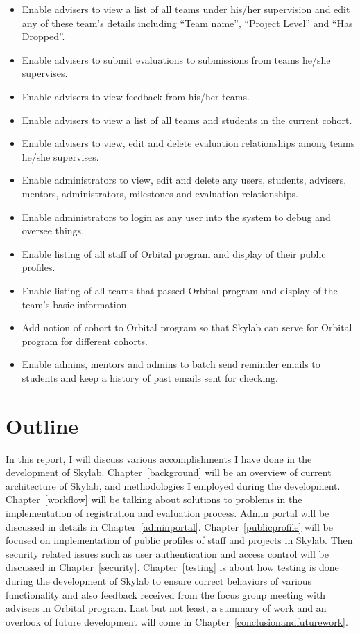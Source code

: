 \begin{itemize}
  \item Enable advisers to view a list of all teams under his/her supervision and edit any of these team's details including ``Team name'', ``Project Level'' and ``Has Dropped''.
  \item Enable advisers to submit evaluations to submissions from teams he/she supervises.
  \item Enable advisers to view feedback from his/her teams.
  \item Enable advisers to view a list of all teams and students in the current cohort.
  \item Enable advisers to view, edit and delete evaluation relationships among teams he/she supervises.
  \item Enable administrators to view, edit and delete any users, students, advisers, mentors, administrators, milestones and evaluation relationships.
  \item Enable administrators to login as any user into the system to debug and oversee things.
  \item Enable listing of all staff of Orbital program and display of their public profiles.
  \item Enable listing of all teams that passed Orbital program and display of the team's basic information.
  \item Add notion of cohort to Orbital program so that Skylab can serve for Orbital program for different cohorts.
  \item Enable admins, mentors and admins to batch send reminder emails to students and keep a history of past emails sent for checking.
\end{itemize}

\section{Outline}

In this report, I will discuss various accomplishments I have done in the development of Skylab. Chapter~\ref{background} will be an overview of current architecture of Skylab, and methodologies I employed during the development. Chapter~\ref{workflow} will be talking about solutions to problems in the implementation of registration and evaluation process. Admin portal will be discussed in details in Chapter~\ref{adminportal}. Chapter~\ref{publicprofile} will be focused on implementation of public profiles of staff and projects in Skylab. Then security related issues such as user authentication and access control will be discussed in Chapter~\ref{security}. Chapter~\ref{testing} is about how testing is done during the development of Skylab to ensure correct behaviors of various functionality and also feedback received from the focus group meeting with advisers in Orbital program. Last but not least, a summary of work and an overlook of future development will come in Chapter~\ref{conclusionandfuturework}.
